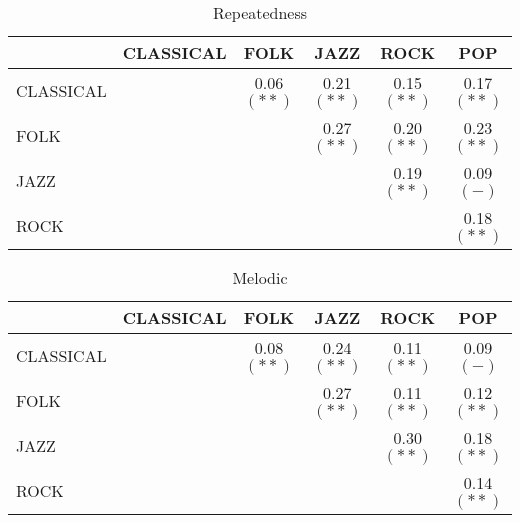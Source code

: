 \documentclass[]{article}
\newcommand{\pn}{$(-)$}
\newcommand{\pb}{$(\ast\ast)$}
\begin{document}
\begin{table}
	\centering
	\caption{Repeatedness}
	\begin{tabular}{|l | c c c c c|}
		\hline
		& CLASSICAL & FOLK & JAZZ & ROCK & POP \\
		\hline
		CLASSICAL& & 0.06 \pb & 0.21 \pb & 0.15 \pb & 0.17 \pb \\
		FOLK & &&0.27 \pb & 0.20 \pb & 0.23 \pb \\
		JAZZ & &&&0.19 \pb & 0.09 \pn\\
		ROCK & &&&&0.18 \pb\\
		\hline
	\end{tabular}
\end{table}

\begin{table}
	\centering
	\caption{Melodic}
	\begin{tabular}{|l | c c c c c|}
		\hline
		& CLASSICAL & FOLK & JAZZ & ROCK & POP \\
		\hline
		CLASSICAL& & 0.08 \pb & 0.24 \pb & 0.11 \pb & 0.09 \pn\\
		FOLK & &&0.27 \pb & 0.11 \pb & 0.12 \pb\\
		JAZZ & &&&0.30 \pb & 0.18 \pb\\
		ROCK & &&&&0.14 \pb\\
		\hline
	\end{tabular}
\end{table}
\end{document}
